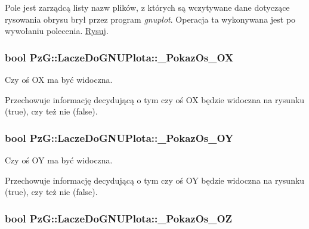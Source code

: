 Pole jest zarządcą listy nazw plików, z których są wczytywane dane dotyczące rysowania obrysu brył przez program {\itshape gnuplot}. Operacja ta wykonywana jest po wywołaniu polecenia. \hyperlink{class_pz_g_1_1_lacze_do_g_n_u_plota_a065f5b8402737cc62b0ad4f66d028335}{Rysuj}. \hypertarget{class_pz_g_1_1_lacze_do_g_n_u_plota_a833aa8994b9913786f920ec8c259731f}{
\subsubsection[{\+\_\+\+Pokaz\+Os\+\_\+\+O\+X}]{\setlength{\rightskip}{0pt plus 5cm}bool Pz\+G\+::\+Lacze\+Do\+G\+N\+U\+Plota\+::\+\_\+\+Pokaz\+Os\+\_\+\+O\+X\hspace{0.3cm}{\ttfamily [protected]}}}\label{class_pz_g_1_1_lacze_do_g_n_u_plota_a833aa8994b9913786f920ec8c259731f}


Czy oś O\+X ma być widoczna. 

Przechowuje informację decydującą o tym czy oś O\+X będzie widoczna na rysunku ({\ttfamily true}), czy też nie ({\ttfamily false}). \hypertarget{class_pz_g_1_1_lacze_do_g_n_u_plota_ae8d9b4dac5eae6ce86b7043c45b70ed8}{
\subsubsection[{\+\_\+\+Pokaz\+Os\+\_\+\+O\+Y}]{\setlength{\rightskip}{0pt plus 5cm}bool Pz\+G\+::\+Lacze\+Do\+G\+N\+U\+Plota\+::\+\_\+\+Pokaz\+Os\+\_\+\+O\+Y\hspace{0.3cm}{\ttfamily [protected]}}}\label{class_pz_g_1_1_lacze_do_g_n_u_plota_ae8d9b4dac5eae6ce86b7043c45b70ed8}


Czy oś O\+Y ma być widoczna. 

Przechowuje informację decydującą o tym czy oś O\+Y będzie widoczna na rysunku ({\ttfamily true}), czy też nie ({\ttfamily false}). \hypertarget{class_pz_g_1_1_lacze_do_g_n_u_plota_a5b0afc06dc248790d2e7475b2162e309}{
\subsubsection[{\+\_\+\+Pokaz\+Os\+\_\+\+O\+Z}]{\setlength{\rightskip}{0pt plus 5cm}bool Pz\+G\+::\+Lacze\+Do\+G\+N\+U\+Plota\+::\+\_\+\+Pokaz\+Os\+\_\+\+O\+Z\hspace{0.3cm}{\ttfamily [protected]}}}\label{class_pz_g_1_1_lacze_do_g_n_u_plota_a5b0afc06dc248790d2e7475b2162e309}



